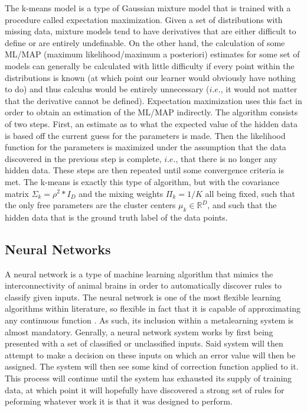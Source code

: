 The k-means model is a type of Gaussian mixture model that is trained with a procedure
called expectation maximization. Given a set of distributions with missing data, mixture models tend to have derivatives that are either difficult to define
or are entirely undefinable. On the other hand, the calculation of some ML/MAP (maximum likelihood/maximum a posteriori)
estimates for some set of models can generally be calculated with little
difficulty if every point within the distributions is known (at which point our
learner would obviously have nothing to do) and thus calculus would be entirely
unnecessary ($i.e.$, it would not matter that the derivative cannot be defined).
Expectation maximization uses this fact in order to obtain an estimation of the
ML/MAP indirectly. The algorithm consists of two steps. First, an estimate as
to what the expected value of the hidden data is based off the current guess for the
parameters is made. Then the likelihood function for the parameters is maximized under
the assumption that the data discovered in the previous step is complete, $i.e.$, that there
is no longer any hidden data. These steps are then repeated until some convergence criteria
is met. The k-means is exactly this type of algorithm, but with the covariance matrix
$\Sigma_{k} = \rho^{2}*I_{D}$ and the mixing weights $\Pi_{k} = 1/K$ all being fixed, such
that the only free parameters are the cluster centers $\mu_{k} \in \mathbb{R}^{D}$,
and such that the hidden data that is the ground truth label of the data points.
\subsection{Neural Networks}
A neural network is a type of machine learning algorithm that mimics
the interconnectivity of animal brains in order to automatically
discover rules to classify given inputs. The neural network is one of the most
flexible learning algorithms within literature, so flexible in fact that it is
capable of approximating any continuous function \cite{Hornik}. As such, its
inclusion within a metalearning system is almost mandatory.  Genrally,
a neural network system works by first being presented with a set of classified or
unclassified inputs. Said system will then attempt to
make a decision on these inputs on which an error value will then be
assigned. The system will then see some kind of correction function
applied to it. This process will continue until the system has
exhausted its supply of training data, at which point it will
hopefully have discovered a strong set of rules for peforming whatever
work it is that it was designed to perform.

